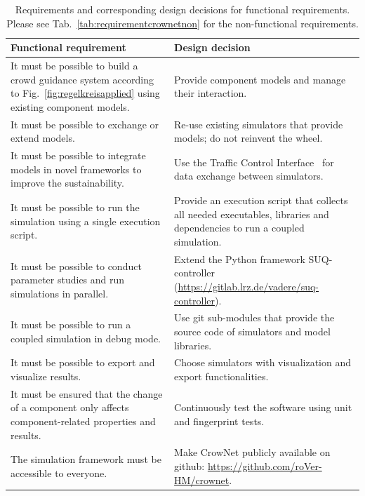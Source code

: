 \begin{table}[hbt!]
\begin{tabular}{|p{7cm}|p{7cm}|}
\hline
\textbf{Functional requirement} & \textbf{Design decision}  \\
\hline 
It must be possible to build a crowd guidance system according to Fig.~\ref{fig:regelkreisapplied} using existing component models. & Provide component models and manage their interaction. \\  \hline
It must be possible to exchange or extend models. & Re-use existing simulators that provide models; do not reinvent the wheel. \\ \hline
It must be possible to integrate models in novel frameworks to improve the sustainability. & Use the Traffic Control Interface~\cite{wegener-2008-com} for data exchange between simulators. \\ \hline
It must be possible to run the simulation using a single execution script. & Provide an execution script that collects all needed executables, libraries and dependencies to run a coupled simulation.  \\ \hline
It must be possible to conduct parameter studies and run simulations in parallel. & Extend the Python framework SUQ-controller (\url{https://gitlab.lrz.de/vadere/suq-controller}). \\ \hline
It must be possible to run a coupled simulation in debug mode. & Use git sub-modules that provide the source code of simulators and model libraries. \\ \hline
It must be possible to export and visualize results. &  Choose simulators with visualization and export functionalities. \\ \hline
It must be ensured that the change of a component only affects component-related properties and results. & Continuously test the software using unit and fingerprint tests. \\ \hline
The simulation framework must be accessible to everyone. & Make CrowNet publicly available on github: \url{https://github.com/roVer-HM/crownet}. \\ \hline
\end{tabular} 
\caption[]{Requirements and corresponding design decisions for functional requirements. Please see Tab.~\ref{tab:requirementcrownetnon} for the non-functional requirements. }
\label{tab:requirementcrownetfunc}
\end{table}


